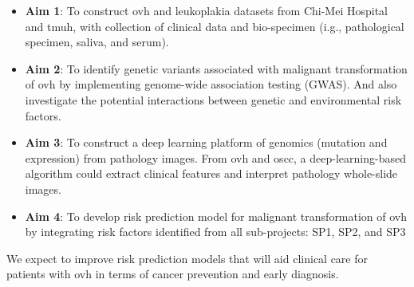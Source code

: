 \documentclass[12pt, a4paper]{article}
\newcommand{\aimone}{To construct \acrshort{ovh} and leukoplakia datasets from Chi-Mei Hospital and \acrfull{tmuh}}
\newcommand{\aimtwo}{To identify genetic variants associated with malignant transformation of \acrshort{ovh} by implementing genome-wide association testing (GWAS)}
\newcommand{\aimthree}{To construct a deep learning platform of genomics (mutation and expression) from pathology images}
\newcommand{\aimfour}{To develop risk prediction model for malignant transformation of \acrshort{ovh} by integrating risk factors identified from all sub-projects: SP1, SP2, and SP3}
\begin{document}
\begin{minipage}[t]{5.5in}
\vspace{0pt}
\begin{itemize}
        
\item \textbf{Aim 1}: \aimone, 
with collection of clinical data and bio-specimen (i.g., pathological specimen, saliva, and serum).


\item \textbf{Aim 2}: \aimtwo. 
And also investigate the potential interactions between genetic and environmental risk factors.

\item \textbf{Aim 3}: \aimthree.
From \acrshort{ovh} and \acrshort{oscc}, a deep-learning-based algorithm could extract clinical features and interpret pathology whole-slide images.



\item \textbf{Aim 4}: 
\aimfour






\end{itemize}



We expect to improve risk prediction models that will aid clinical care for patients with \acrshort{ovh} in terms of cancer prevention and early diagnosis.

\end{minipage}
\end{document}
